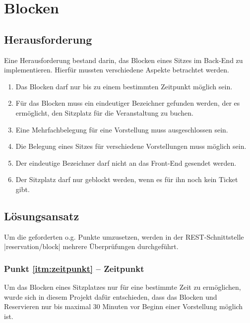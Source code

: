 \section{Blocken}
\label{sec:blocken}

\subsection{Herausforderung}
\label{ssec:herausforderung_blocken}

Eine Herausforderung bestand darin, das Blocken eines Sitzes im Back-End zu implementieren.
Hierfür mussten verschiedene Aspekte betrachtet werden.

\begin{enumerate}
\label{enum:blocken}
\item \label{itm:zeitpunkt}Das Blocken darf nur bis zu einem bestimmten Zeitpunkt möglich sein.
\item \label{itm:bezeichner}Für das Blocken muss ein eindeutiger Bezeichner gefunden werden, der es ermöglicht, den Sitzplatz für die Veranstaltung zu buchen.
\item \label{itm:mehr_eine_vorstellung}Eine Mehrfachbelegung für eine Vorstellung muss ausgeschlossen sein.
\item \label{itm:mehr_mehrere_vorstellungen}Die Belegung eines Sitzes für verschiedene Vorstellungen muss möglich sein.
\item \label{itm:front_end} Der eindeutige Bezeichner darf nicht an das Front-End gesendet werden.
\item \label{itm:ticket} Der Sitzplatz darf nur geblockt werden, wenn es für ihn noch kein Ticket gibt.
\end{enumerate}

\subsection{Lösungsansatz}
\label{ssec:loesung_blocken}

Um die geforderten o.g. Punkte umzusetzen, werden in der \acs{REST}-Schnittstelle \\\jinline |reservation/block| mehrere Überprüfungen durchgeführt.

\subsubsection*{Punkt \ref{itm:zeitpunkt} -- Zeitpunkt}
\label{ssssec:Zeitpunkt}
Um das Blocken eines Sitzplatzes nur für eine bestimmte Zeit zu ermöglichen, wurde sich in diesem Projekt dafür entschieden, dass das Blocken und Reservieren nur bis maximal 30 Minuten vor Beginn einer Vorstellung möglich ist.

